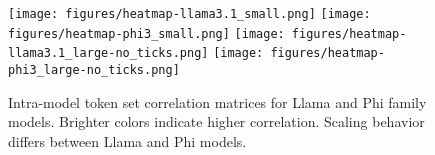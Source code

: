 \begin{figure}[t]
\centering
\texttt{[image: figures/heatmap-llama3.1\_small.png]}
\texttt{[image: figures/heatmap-phi3\_small.png]}
\texttt{[image: figures/heatmap-llama3.1\_large-no\_ticks.png]}
\texttt{[image: figures/heatmap-phi3\_large-no\_ticks.png]}
\caption{Intra-model token set correlation matrices for Llama and Phi family models. Brighter colors indicate higher correlation. Scaling behavior differs between Llama and Phi models.}
\label{fig:heatmap}
\end{figure}
